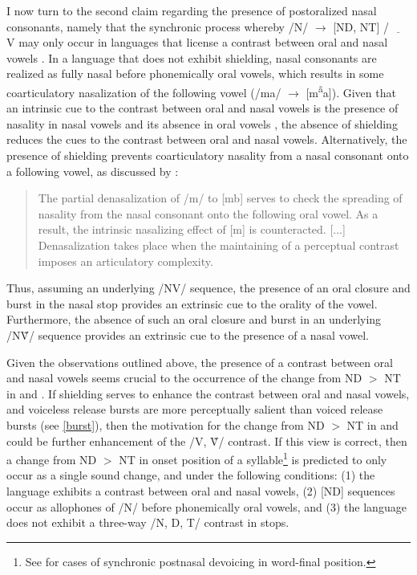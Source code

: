 \documentclass[output=paper,hidelinks]{langscibook}
\begin{document}
I now turn to the second claim regarding the presence of postoralized nasal consonants, namely that the synchronic process whereby /N/ $\rightarrow$ [{ND, NT}] / $\underline{\hspace{1em}}$ V may only occur in languages that license a contrast between oral and nasal vowels \citep{Hyman1975, herbert1986, stanton2017}. In a language that does not exhibit shielding, nasal consonants are realized as fully nasal before phonemically oral vowels, which results in some coarticulatory nasalization of the following vowel (/ma/ $\rightarrow$ [m\textsuperscript{\~a}a]). Given that an intrinsic cue to the contrast between oral and nasal vowels is the presence of nasality in nasal vowels and its absence in oral vowels \citep{BeddorOnsuwan2003}, the absence of shielding reduces the cues to the contrast between oral and nasal vowels. Alternatively, the presence of shielding prevents coarticulatory nasality from a nasal consonant onto a following vowel, as discussed by \citet[256]{Hyman1975}:

\begin{quote}
The partial denasalization of /m/ to [mb] serves to check the spreading of nasality from the nasal consonant onto the following oral vowel. As a result, the intrinsic nasalizing effect of [m] is counteracted. [...] Denasalization takes place when the maintaining of a perceptual contrast imposes an articulatory complexity.
\end{quote}
Thus, assuming an underlying /NV/ sequence, the presence of an oral closure and burst in the nasal stop provides an extrinsic cue to the orality of the vowel. Furthermore, the absence of such an oral closure and burst in an underlying /N\~V/ sequence provides an extrinsic cue to the presence of a nasal vowel.

Given the observations outlined above, the presence of a contrast between oral and nasal vowels seems crucial to the occurrence of the change from ND $>$ NT in  and . If shielding serves to enhance the contrast between oral and nasal vowels, and voiceless release bursts are more perceptually salient than voiced release bursts (see \ref{burst}), then the motivation for the change from ND $>$ NT in  and  could be further enhancement of the  /V, \~V/ contrast. If this view is correct, then a change from ND $>$ NT in onset position of a syllable\footnote{See \citet[44]{stanton2017} for cases of synchronic postnasal devoicing in word-final position.} is predicted to only occur as a single sound change, and under the following conditions: (1) the language exhibits a contrast between oral and nasal vowels, (2) [ND] sequences occur as allophones of /N/ before phonemically oral vowels, and (3) the language does not exhibit a three-way /N, D, T/ contrast in stops.
\end{document}
